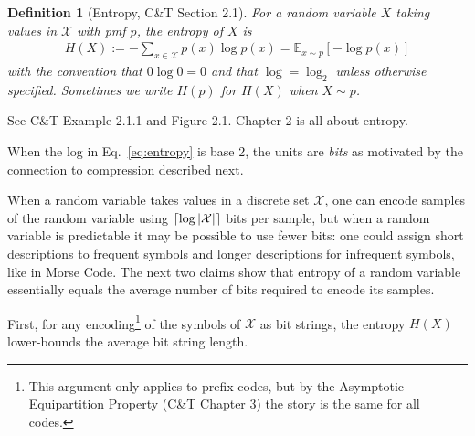 \documentclass{article}
\newtheorem{mydef}{Definition}
\DeclarePairedDelimiter{\ceil}{\lceil}{\rceil}
\newcommand{\E}{\mathbb{E}}
\begin{document}
    \begin{mydef}[Entropy, C\&T Section 2.1]
        For a random variable $X$ taking values in $\mathcal{X}$ with pmf $p$,
        the \emph{entropy} of $X$ is
        \begin{align}
            H(X) := - \sum_{x \in \mathcal{X}} p(x) \log p(x) = \E_{x \sim p}[- \log p(x) ] \label{eq:entropy}%
        \end{align}
        with the convention that $0 \log 0 = 0$ and that $\log=\log_2$
        unless otherwise specified. Sometimes we write $H(p)$ for $H(X)$ when
        $X \sim p$.
    \end{mydef}

    See C\&T Example 2.1.1 and Figure 2.1. Chapter 2 is all about entropy.

    When the log in Eq.~\eqref{eq:entropy} is base 2, the units are \emph{bits}
    as motivated by the connection to compression described next.

    When a random variable takes values in a discrete set $\mathcal{X}$, one
    can encode samples of the random variable using $\ceil{\log |\mathcal{X}|}$
    bits per sample, but when a random variable is predictable it may be
    possible to use fewer bits: one could assign short descriptions to frequent
    symbols and longer descriptions for infrequent symbols, like in Morse Code.
    The next two claims show that entropy of a random variable essentially
    equals the average number of bits required to encode its samples.

    First, for any encoding\footnote{This argument only applies to prefix
        codes, but by the Asymptotic Equipartition Property
        (C\&T Chapter 3) the story is the same for all
        codes.} of the symbols of $\mathcal{X}$ as bit strings, the entropy
    $H(X)$ lower-bounds the average bit string length.
\end{document}
